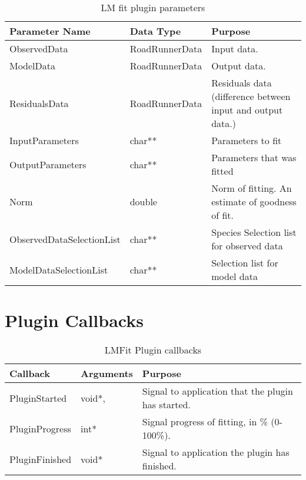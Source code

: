 \begin{table}[ht]
\centering %
\begin{tabular}{l l p{7.5cm}} %

Parameter Name & Data Type & Purpose \\ [0.5ex] %
\hline %
ObservedData   	& 	RoadRunnerData 		& Input data.  \\
ModelData      	& 	RoadRunnerData    	& Output data. \\
ResidualsData  	& 	RoadRunnerData    	& Residuals data (difference between input and output data.) \\
InputParameters &   char**				& Parameters to fit \\
OutputParameters &   char**				& Parameters that was fitted \\
Norm			&	 double				& Norm of fitting. An estimate of goodness of fit. \\
ObservedDataSelectionList & char**	&	Species Selection list for observed data \\
ModelDataSelectionList & char**	&	Selection list for model data \\


\hline %
\end{tabular}
\caption{LM fit plugin parameters} 
\label{table:lmfitPluginParameters} 
\end{table}

\section{Plugin Callbacks}
\begin{table}[ht]
\centering %
\begin{tabular}{l l p{7.5cm}} %

Callback & Arguments & Purpose \\ [0.5ex] %
\hline %
PluginStarted  	& 	void*, & Signal to application that the plugin has started. \\
PluginProgress	& 	int*  & Signal progress of fitting, in \% (0-100\%). \\
PluginFinished	& 	void* & Signal to application the plugin has finished. \\

\hline %
\end{tabular}
\caption{LMFit Plugin callbacks} 
\label{table:lmfitPluginCallBacks} 
\end{table}

